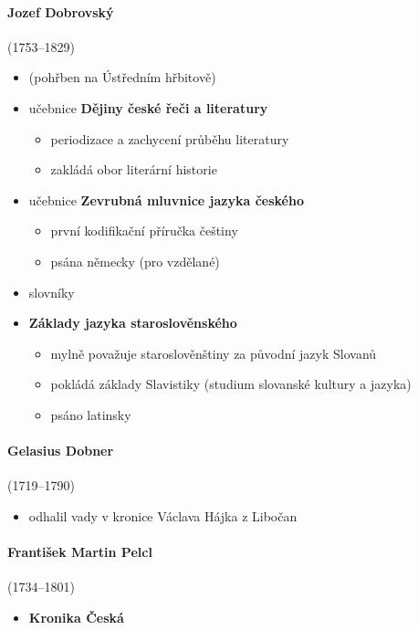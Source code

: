 \paragraph{Jozef Dobrovský}(1753--1829)
\begin{itemize}
\item (pohřben na Ústředním hřbitově)
\item učebnice \textbf{Dějiny české řeči a literatury}
	\begin{itemize}
	\item periodizace a zachycení průběhu literatury
	\item zakládá obor literární historie
	\end{itemize}
\item učebnice \textbf{Zevrubná mluvnice jazyka českého}
	\begin{itemize}
	\item první kodifikační příručka češtiny
	\item psána německy (pro vzdělané)
	\end{itemize}
\item slovníky
\item \textbf{Základy jazyka staroslověnského}
	\begin{itemize}
	\item mylně považuje staroslověnštiny za původní jazyk Slovanů
	\item pokládá základy Slavistiky (studium slovanské kultury a jazyka)
	\item psáno latinsky
	\end{itemize}
\end{itemize}

\paragraph{Gelasius Dobner}(1719--1790)
	\begin{itemize}
	\item odhalil vady v kronice Václava Hájka z Libočan
	\end{itemize}
	
\paragraph{František Martin Pelcl} (1734--1801)
	\begin{itemize}
	\item \textbf{Kronika Česká}
	\end{itemize}
	
